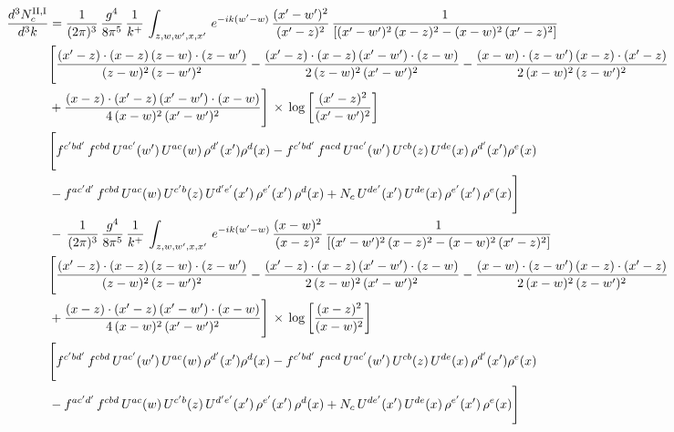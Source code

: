 \documentclass[9pt]{article}
\numberwithin{equation}{section}
\begin{document}
\begin{align}
    \frac{d^{3}N^{\rm II,I}_{c}}{d^{3}k}  & =  \frac{1}{(2\pi)^{3}}\, \frac{g^{4}}{8\pi^{5}}\,\frac{1}{k^{+}}\,\int_{z,w,w^{\prime},x,x'}\, e^{-ik(w^{\prime}-w)}\,\frac{(x'-w')^{2}}{(x'-z)^{2}}\, \frac{1}{\left[(x'-w')^{2}\, (x-z)^{2} - (x-w)^{2}\, (x'-z)^{2}\right]} \notag \\ & \Bigg[\frac{(x'-z)\cdot (x-z)\, (z-w)\cdot (z-w')}{(z-w)^{2}\, (z-w')^{2}}-\frac{(x'-z)\cdot (x-z)\, (x'-w')\cdot (z-w)}{2\, (z-w)^{2}\, (x'-w')^{2}} -\frac{(x-w)\cdot (z-w')\, (x-z)\cdot (x'-z)}{2\, (x-w)^{2}\, (z-w')^{2}}\notag \\ & +\frac{(x-z)\cdot (x'-z)\, (x'-w')\cdot (x-w)}{4\, (x-w)^{2}\, (x'-w')^{2}}\Bigg]\,\times\, \log{\left[\frac{(x'-z)^{2}}{(x'-w')^{2}}\right]} \notag \\ &  \Bigg[f^{c'bd'}\,f^{cbd}\, U^{ac'}(w')\,U^{ac}(w)\,\rho^{d'}(x')\rho^{d}(x)- f^{c'bd'}\,f^{acd}\,U^{ac'}(w')\,U^{cb}(z)\,U^{de}(x)\,\rho^{d'}(x')\rho^{e}(x) \notag \\ & -f^{ac'd'}\,f^{cbd}\,U^{ac}(w)\,U^{c'b}(z)\,U^{d'e'}(x')\,\rho^{e'}(x')\,\rho^{d}(x) +N_{c}\,U^{de'}(x')\,U^{de}(x)\,\rho^{e'}(x')\,\rho^{e}(x)\Bigg] \notag \\ & -\,\frac{1}{(2\pi)^{3}}\, \frac{g^{4}}{8\pi^{5}}\,\frac{1}{k^{+}}\,\int_{z,w,w^{\prime},x,x'}\, e^{-ik(w^{\prime}-w)}\,\frac{(x-w)^{2}}{(x-z)^{2}}\, \frac{1}{\left[(x'-w')^{2}\, (x-z)^{2} - (x-w)^{2}\, (x'-z)^{2}\right]} \notag \\ & \Bigg[\frac{(x'-z)\cdot (x-z)\, (z-w)\cdot (z-w')}{(z-w)^{2}\, (z-w')^{2}}-\frac{(x'-z)\cdot (x-z)\, (x'-w')\cdot (z-w)}{2\, (z-w)^{2}\, (x'-w')^{2}} -\frac{(x-w)\cdot (z-w')\, (x-z)\cdot (x'-z)}{2\, (x-w)^{2}\, (z-w')^{2}}\notag \\ & +\frac{(x-z)\cdot (x'-z)\, (x'-w')\cdot (x-w)}{4\, (x-w)^{2}\, (x'-w')^{2}}\Bigg]\,\times\, \log{\left[\frac{(x-z)^{2}}{(x-w)^{2}}\right]} \notag \\ &  \Bigg[f^{c'bd'}\,f^{cbd}\, U^{ac'}(w')\,U^{ac}(w)\,\rho^{d'}(x')\rho^{d}(x)- f^{c'bd'}\,f^{acd}\,U^{ac'}(w')\,U^{cb}(z)\,U^{de}(x)\,\rho^{d'}(x')\rho^{e}(x) \notag \\ & -f^{ac'd'}\,f^{cbd}\,U^{ac}(w)\,U^{c'b}(z)\,U^{d'e'}(x')\,\rho^{e'}(x')\,\rho^{d}(x) +N_{c}\,U^{de'}(x')\,U^{de}(x)\,\rho^{e'}(x')\,\rho^{e}(x)\Bigg]
\end{align}
\end{document}
